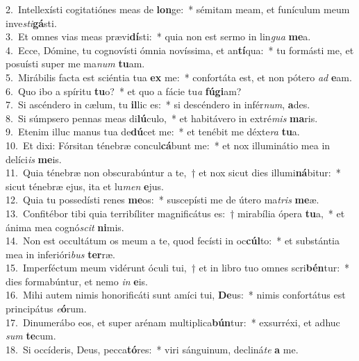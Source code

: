 {2.~}Intellexísti cogitatiónes meas de \textbf{lon}ge:~* sémitam meam, et funículum meum inve\textit{sti}\textbf{gá}sti.\\
{3.~}Et omnes vias meas prævi\textbf{dí}sti:~* quia non est sermo in lin\textit{gua} \textbf{me}a.\\
{4.~}Ecce, Dómine, tu cognovísti ómnia novíssima, et an\textbf{tí}qua:~* tu formásti me, et posuísti super me ma\textit{num} \textbf{tu}am.\\
{5.~}Mirábilis facta est sciéntia tua \textbf{ex} me:~* confortáta est, et non pótero \textit{ad} \textbf{e}am.\\
{6.~}Quo ibo a spíritu \textbf{tu}o?~* et quo a fácie tu\textit{a} \textbf{fú}\textbf{gi}am?\\
{7.~}Si ascéndero in cælum, tu \textbf{il}lic es:~* si descéndero in infér\textit{num}, \textbf{a}des.\\
{8.~}Si súmpsero pennas meas di\textbf{lú}culo,~* et habitávero in extré\textit{mis} \textbf{ma}ris.\\
{9.~}Etenim illuc manus tua de\textbf{dú}cet me:~* et tenébit me déxte\textit{ra} \textbf{tu}a.\\
{10.~}Et dixi: Fórsitan ténebræ concul\textbf{cá}bunt me:~* et nox illuminátio mea in delíci\textit{is} \textbf{me}is.\\
{11.~}Quia ténebræ non obscurabúntur a te,~† et nox sicut dies illumi\textbf{ná}bitur:~* sicut ténebræ ejus, ita et lu\textit{men} \textbf{e}jus.\\
{12.~}Quia tu possedísti renes \textbf{me}os:~* suscepísti me de útero ma\textit{tris} \textbf{me}æ.\\
{13.~}Confitébor tibi quia terribíliter magnificátus es:~† mirabília ópera \textbf{tu}a,~* et ánima mea cognó\textit{scit} \textbf{ni}mis.\\
{14.~}Non est occultátum os meum a te, quod fecísti in oc\textbf{cúl}to:~* et substántia mea in inferióri\textit{bus} \textbf{ter}ræ.\\
{15.~}Imperféctum meum vidérunt óculi tui,~† et in libro tuo omnes scri\textbf{bén}tur:~* dies formabúntur, et nemo \textit{in} \textbf{e}is.\\
{16.~}Mihi autem nimis honorificáti sunt amíci tui, \textbf{De}us:~* nimis confortátus est principátus \textit{e}\textbf{ó}rum.\\
{17.~}Dinumerábo eos, et super arénam multiplica\textbf{bún}tur:~* exsurréxi, et adhuc \textit{sum} \textbf{te}cum.\\
{18.~}Si occíderis, Deus, pecca\textbf{tó}res:~* viri sánguinum, decliná\textit{te} \textbf{a} me.\\
